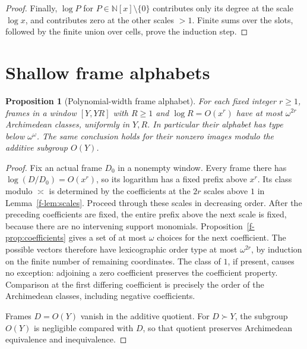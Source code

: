 \documentclass[11pt]{article}
\newtheorem{proposition}[theorem]{Proposition}
\theoremstyle{definition}
\theoremstyle{remark}
\newcommand{\N}{\mathbb N}
\newcommand{\arch}{\mathrel{\asymp}}
\numberwithin{equation}{section}
\begin{document}
\begin{proof}
Finally, \(\log P\) for \(P\in\N[x]\setminus\{0\}\) contributes
only its degree at the scale \(\log x\), and contributes zero at
the other scales \(>1\).  Finite sums over the slots, followed by
the finite union over cells, prove the induction step.
\end{proof}


\section{Shallow frame alphabets}
\begin{proposition}[Polynomial-width frame alphabet]\label{shallow}
For each fixed integer $r\ge1$, frames in a window $[Y,YR]$ with
$R\ge1$ and $\log R=O(x^r)$ have at most $\omega^{2r}$
Archimedean classes, uniformly in $Y,R$. In particular their
alphabet has type below $\omega^\omega$. The same conclusion
holds for their nonzero images modulo the additive subgroup $O(Y)$.
\end{proposition}
\begin{proof}
Fix an actual frame $D_0$ in a nonempty window. Every frame there
has $\log(D/D_0)=O(x^r)$, so its logarithm has a fixed prefix
above $x^r$. Its class modulo $\arch$ is determined by the
coefficients at the $2r$ scales above $1$ in
Lemma~\ref{f-lem:scales}.
Proceed through these scales in decreasing order. After the
preceding coefficients are fixed, the entire prefix above the
next scale is fixed, because there are no intervening support
monomials. Proposition~\ref{f-prop:coefficients} gives a set
of at most $\omega$ choices for the next coefficient. The possible
vectors therefore have lexicographic order type at most
$\omega^{2r}$, by induction on the finite number of remaining
coordinates. The class of $1$, if present, causes no exception:
adjoining a zero coefficient preserves the coefficient property.
Comparison at the first differing coefficient is precisely the
order of the Archimedean classes, including negative coefficients.

Frames $D=O(Y)$ vanish in the additive quotient. For $D\succ Y$,
the subgroup $O(Y)$ is negligible compared with $D$, so that
quotient preserves Archimedean equivalence and inequivalence.
\end{proof}
\end{document}
